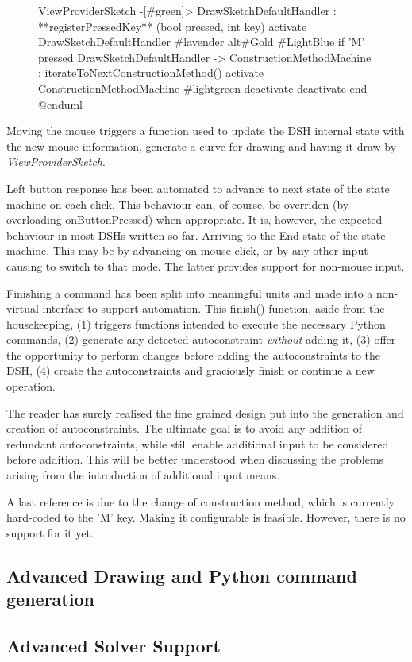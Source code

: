 \documentclass[12pt,twoside,a4paper]{book}
\newcommand{\ViewProviderSketch}{\emph{ViewProviderSketch}}
\begin{document}
\begin{figure}
\begin{plantuml}
        ViewProviderSketch -[#green]> DrawSketchDefaultHandler : **registerPressedKey** (bool pressed, int key)
        activate DrawSketchDefaultHandler #lavender
        alt#Gold #LightBlue if 'M' pressed
        DrawSketchDefaultHandler -> ConstructionMethodMachine : iterateToNextConstructionMethod()
        activate ConstructionMethodMachine #lightgreen
        deactivate
        deactivate
        end
        @enduml
        \end{plantuml}
    \end{figure}

    Moving the mouse triggers a function used to update the DSH internal state with the new mouse information, generate a curve for drawing and having it draw by \ViewProviderSketch{}.

    Left button response has been automated to advance to next state of the state machine on each click. This behaviour can, of course, be overriden (by overloading onButtonPressed) when appropriate. It is, however, the expected behaviour in most DSHs written so far. Arriving to the End state of the state machine. This may be by advancing on mouse click, or by any other input causing to switch to that mode. The latter provides support for non-mouse input.

    Finishing a command has been split into meaningful units and made into a non-virtual interface to support automation. This finish() function, aside from the housekeeping, (1) triggers functions intended to execute the necessary Python commands, (2) generate any detected autoconstraint \emph{without} adding it, (3) offer the opportunity to perform changes before adding the autoconstraints to the DSH, (4) create the autoconstraints and graciously finish or continue a new operation.

    The reader has surely realised the fine grained design put into the generation and creation of autoconstraints. The ultimate goal is to avoid any addition of redundant autoconstraints, while still enable additional input to be considered before addition. This will be better understood when discussing the problems arising from the introduction of additional input means.

    A last reference is due to the change of construction method, which is currently hard-coded to the 'M' key. Making it configurable is feasible. However, there is no support for it yet.

    \subsection{Advanced Drawing and Python command generation}



    \subsection{Advanced Solver Support}
\end{document}
